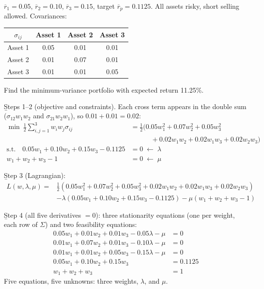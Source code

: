 \begin{example}
    $\overline{r}_1 = 0.05$, $\overline{r}_2 = 0.10$, $\overline{r}_3 = 0.15$, target $\overline{r}_p = 0.1125$. All assets risky, short selling allowed. Covariances:
    \begin{center}
    \begin{tabular}{cccc}
        \toprule
        $\sigma_{ij}$ & Asset 1 & Asset 2 & Asset 3\\
        \midrule
        Asset 1 & 0.05 & 0.01 & 0.01\\
        Asset 2 & 0.01 & 0.07 & 0.01\\
        Asset 3 & 0.01 & 0.01 & 0.05\\
        \bottomrule
    \end{tabular}
    \end{center}
    Find the minimum-variance portfolio with expected return 11.25\%.

    \b{Steps 1--2} (objective and constraints). Each cross term appears  in the double sum ($\sigma_{12}w_1w_2$ and $\sigma_{21}w_2w_1$), so $0.01 + 0.01 = 0.02$:
    \begin{align*}
        \min\ \frac{1}{2}\sum_{i,j=1}^{3}w_iw_j\sigma_{ij} &= \frac{1}{2}\big(0.05w_1^2 + 0.07w_2^2 + 0.05w_3^2\\
        &\qquad\quad + 0.02w_1w_2 + 0.02w_1w_3 + 0.02w_2w_3\big)\\[4pt]
        \text{s.t.}\quad 0.05w_1 + 0.10w_2 + 0.15w_3 - 0.1125 &= 0 \;\longleftarrow\; \lambda\\
        w_1 + w_2 + w_3 - 1 &= 0 \;\longleftarrow\; \mu
    \end{align*}

    \b{Step 3} (Lagrangian):
    \begin{align*}
        L(w,\lambda,\mu) = {} & \tfrac{1}{2}\left(0.05w_1^2 + 0.07w_2^2 + 0.05w_3^2 + 0.02w_1w_2 + 0.02w_1w_3 + 0.02w_2w_3\right)\\
        & - \lambda\left(0.05w_1 + 0.10w_2 + 0.15w_3 - 0.1125\right) - \mu\left(w_1 + w_2 + w_3 - 1\right)
    \end{align*}

    \b{Step 4} (all five derivatives $= 0$): three stationarity equations (one per weight, each row of $\Sigma$) and two feasibility equations:
    \begin{align}
        0.05w_1 + 0.01w_2 + 0.01w_3 - 0.05\lambda - \mu &= 0 \tag{1}\\
        0.01w_1 + 0.07w_2 + 0.01w_3 - 0.10\lambda - \mu &= 0 \tag{2}\\
        0.01w_1 + 0.01w_2 + 0.05w_3 - 0.15\lambda - \mu &= 0 \tag{3}\\
        0.05w_1 + 0.10w_2 + 0.15w_3 &= 0.1125 \tag{4}\\
        w_1 + w_2 + w_3 &= 1 \tag{5}
    \end{align}
    Five equations, five unknowns: three weights, $\lambda$, and $\mu$.


\end{example}
